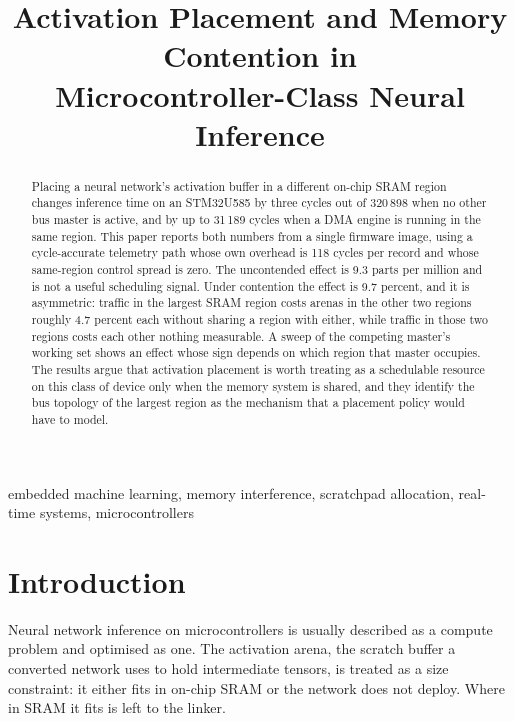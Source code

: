 \documentclass[conference]{IEEEtran}
\begin{document}
\title{Activation Placement and Memory Contention in\\Microcontroller-Class Neural Inference}

\author{
}

\maketitle

\begin{abstract}
Placing a neural network's activation buffer in a different on-chip SRAM
region changes inference time on an STM32U585 by three cycles out of
320\,898 when no other bus master is active, and by up to 31\,189 cycles
when a DMA engine is running in the same region. This paper reports both
numbers from a single firmware image, using a cycle-accurate telemetry
path whose own overhead is 118 cycles per record and whose same-region
control spread is zero. The uncontended effect is 9.3 parts per million
and is not a useful scheduling signal. Under contention the effect is
9.7 percent, and it is asymmetric: traffic in the largest SRAM region
costs arenas in the other two regions roughly 4.7 percent each without
sharing a region with either, while traffic in those two regions costs
each other nothing measurable. A sweep of the competing master's working
set shows an effect whose sign depends on which region that master
occupies. The results argue that activation placement is worth treating
as a schedulable resource on this class of device only when the memory
system is shared, and they identify the bus topology of the largest
region as the mechanism that a placement policy would have to model.
\end{abstract}

\begin{IEEEkeywords}
embedded machine learning, memory interference, scratchpad allocation,
real-time systems, microcontrollers
\end{IEEEkeywords}

\section{Introduction}

Neural network inference on microcontrollers is usually described as a
compute problem and optimised as one. The activation arena, the scratch
buffer a converted network uses to hold intermediate tensors, is treated
as a size constraint: it either fits in on-chip SRAM or the network does
not deploy. Where in SRAM it fits is left to the linker.
\end{document}
